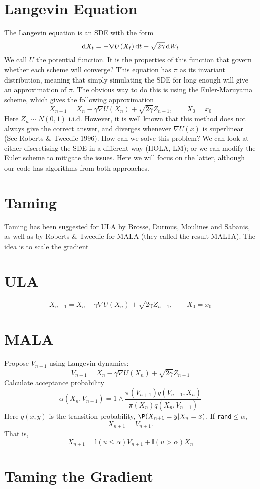 \section{Langevin Equation}
The Langevin equation is an SDE with the form 
\[\mathop{}\!\mathrm{d} X_t = -\nabla U(X_t)\mathop{}\!\mathrm{d} t +\sqrt{2\gamma}\mathop{}\!\mathrm{d} W_t\]
We call \(U\) the potential function. It is the properties of this function that govern whether each scheme will converge? This equation has \(\pi\) as its invariant distribution, meaning that simply simulating the SDE for long enough will give an approximation of \(\pi\). The obvious way to do this is using the Euler-Maruyama scheme, which gives the following approximation
\[X_{n+1} = X_n -\gamma \nabla U(X_n) +\sqrt{2\gamma} Z_{n+1},\qquad X_0= x_0 \]
Here \(Z_n \sim N(0,1)\) i.i.d. However, it is well known that this method does not always give the correct answer, and diverges whenever \(\nabla U(x)\) is superlinear (See Roberts \& Tweedie 1996). How can we solve this problem? We can look at either discretising the SDE in a different way (HOLA, LM); or we can modify the Euler scheme to mitigate the issues. Here we will focus on the latter, although our code has algorithms from both approaches. 

\section{Taming}
Taming has been suggested for ULA by Brosse, Durmus, Moulines and Sabanis, as well as by Roberts \& Tweedie for MALA (they called the result MALTA). The idea is to scale the gradient 

\section{ULA}
\[X_{n+1} = X_n -\gamma \nabla U(X_n) +\sqrt{2\gamma} Z_{n+1},\qquad X_0= x_0 \]
\section{MALA}
\cite{RT_MALA}
Propose \(V_{n+1}\) using Langevin dynamics:
\[V_{n+1} = X_n -\gamma \nabla U(X_n) +\sqrt{2\gamma} Z_{n+1}\]
Calculate acceptance probability
\[\alpha(X_n,V_{n+1}) = 1\wedge \frac{\pi(V_{n+1})q(V_{n+1},X_n)}{\pi(X_n)q(X_n,V_{n+1})}\]
Here \(q(x,y)\) is the transition probability, \(\P(X_{n+1}=y | X_{n}=x)\). If \texttt{rand}\(\leq\alpha\), 
\[X_{n+1} = V_{n+1}.\]
That is,
\[X_{n+1} = \mathbb{I}(u\leq \alpha)V_{n+1} +\mathbb{I}(u > \alpha)X_n \]

\section{Taming the Gradient}
